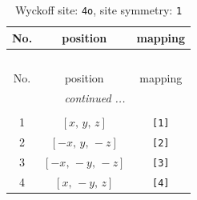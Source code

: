\documentclass[fleqn,8pt]{jsarticle}
\begin{document}
\renewcommand{\arraystretch}{1.2}
\begin{longtable}{ccc}
\caption{Wyckoff site: {\tt 4o}, site symmetry: {\tt 1}}
 \\
 \hline \hline
No. & position & mapping \\ \hline \endfirsthead

\multicolumn{2}{l}{\tablename\ \thetable{}} \\
 \hline \hline
No. & position & mapping \\ \hline \endhead

 \hline \hline
\multicolumn{2}{r}{\footnotesize\it continued ...} \\ \endfoot

 \hline \hline
\multicolumn{2}{r}{} \\ \endlastfoot

1 & $\left[ x,\, y,\, z \right]$ & {\tt [1]} \\ \hline
2 & $\left[ - x,\, y,\, - z \right]$ & {\tt [2]} \\ \hline
3 & $\left[ - x,\, - y,\, - z \right]$ & {\tt [3]} \\ \hline
4 & $\left[ x,\, - y,\, z \right]$ & {\tt [4]} \\
\end{longtable}
\end{document}
